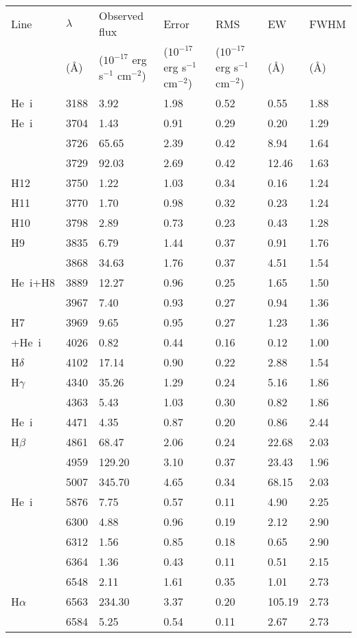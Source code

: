 \documentclass[useAMS,usenatbib]{mn2e}
\def\Ha{H{$\alpha$}}
\def\Hb{H{$\beta$}}
\def\oiii{[O~{\sc iii}]}
\def\siii{[S~{\sc iii}]}
\def\nii{[N~{\sc ii}]}
\def\neiii{[Ne~{\sc iii}]}
\def\nii{[N~{\sc ii}]}
\def\oii{[O~{\sc ii}]}
\def\oi{[O~{\sc i}]}
\begin{document}
\begin{table*}
\begin{center}
\begin{tabular}[t]{lllllll}
\hline 
\hline
Line & $\lambda$ & Observed flux & Error & RMS & EW & FWHM \\
 & (\AA) & ($10^{-17}$ erg s$^{-1}$ cm$^{-2}$) & ($10^{-17}$ erg s$^{-1}$ cm$^{-2}$) & ($10^{-17}$ erg s$^{-1}$ cm$^{-2}$) & (\AA)  & (\AA) \\
\hline
He~{\sc i}&3188&3.92&1.98&0.52&0.55&1.88\\
He~{\sc i}&3704&1.43&0.91&0.29&0.20&1.29\\
\oii&3726&65.65&2.39&0.42&8.94&1.64\\
\oii&3729&92.03&2.69&0.42&12.46&1.63\\
H12&3750&1.22&1.03&0.34&0.16&1.24\\
H11&3770&1.70&0.98&0.32&0.23&1.24\\
H10&3798&2.89&0.73&0.23&0.43&1.28\\
H9&3835&6.79&1.44&0.37&0.91&1.76\\
\neiii&3868&34.63&1.76&0.37&4.51&1.54\\
He~{\sc i}+H8&3889&12.27&0.96&0.25&1.65&1.50\\
\neiii&3967&7.40&0.93&0.27&0.94&1.36\\
H7&3969&9.65&0.95&0.27&1.23&1.36\\
\nii+He~{\sc i}&4026&0.82&0.44&0.16&0.12&1.00\\
H$\delta$&4102&17.14&0.90&0.22&2.88&1.54\\
H$\gamma$&4340&35.26&1.29&0.24&5.16&1.86\\
\oiii&4363&5.43&1.03&0.30&0.82&1.86\\
He~{\sc i}&4471&4.35&0.87&0.20&0.86&2.44\\
\Hb&4861&68.47&2.06&0.24&22.68&2.03\\
\oiii&4959&129.20&3.10&0.37&23.43&1.96\\
\oiii&5007&345.70&4.65&0.34&68.15&2.03\\
He~{\sc i}&5876&7.75&0.57&0.11&4.90&2.25\\
\oi&6300&4.88&0.96&0.19&2.12&2.90\\
\siii&6312&1.56&0.85&0.18&0.65&2.90\\
\oi&6364&1.36&0.43&0.11&0.51&2.15\\
\nii&6548&2.11&1.61&0.35&1.01&2.73\\
\Ha&6563&234.30&3.37&0.20&105.19&2.73\\
\nii&6584&5.25&0.54&0.11&2.67&2.73\\

\end{tabular}
\end{center}
\end{table*}
\end{document}
